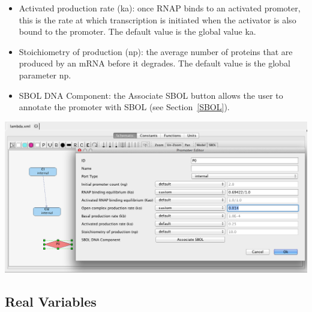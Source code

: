 \documentclass[titlepage,11pt]{article}
\begin{document}
\begin{itemize}
\item Activated production rate (ka): once RNAP binds to an activated promoter, this is the rate at which transcription is initiated when the activator is also bound to the promoter.  The default value is the global value ka.
\item Stoichiometry of production (np): the average number of proteins that are produced by an mRNA before it degrades.  The default value is the global parameter np.
\item SBOL DNA Component: the Associate SBOL button allows the user to annotate the promoter with SBOL (see Section~\ref{SBOL}).
\end{itemize}

\begin{center}
\includegraphics[width=160mm]{screenshots/promoter}
\end{center}

\clearpage

\subsection{\label{Variables}Real Variables}
\end{document}
